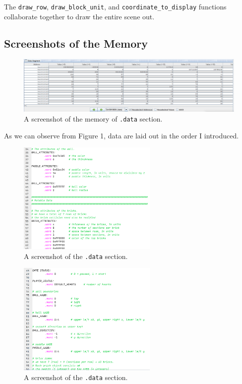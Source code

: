 \documentclass{article}
\newcommand{\code}[1]{\texttt{#1}}
\begin{document}
The \code{draw\_row}, \code{draw\_block\_unit}, and \code{coordinate\_to\_display} functions collaborate together to draw the entire scene out.

\subsection{Screenshots of the Memory}

\begin{figure}[h!]
    \centering
    \includegraphics[width=1.0\textwidth]{memory_0.png}
    \caption{A screenshot of the memory of \code{.data} section.}
\end{figure}

As we can observe from Figure 1, data are laid out in the order I introduced.

\begin{figure}[h!]
    \centering
    \includegraphics[width=0.6\textwidth]{memory_1.png}
    \caption{A screenshot of the \code{.data} section.}
\end{figure}

\begin{figure}[h!]
    \centering
    \includegraphics[width=0.6\textwidth]{memory_2.png}
    \caption{A screenshot of the \code{.data} section.}
\end{figure}
\end{document}
